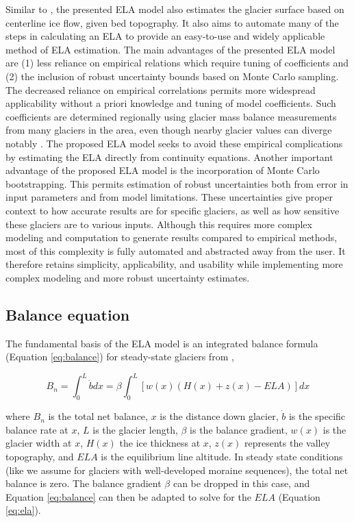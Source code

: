 \documentclass[review]{elsarticle}
\begin{document}
Similar to \cite{benn_exceltm_2010, pellitero_glare_2016}, the presented ELA model also estimates the glacier surface based on centerline ice flow, given bed topography.
It also aims to automate many of the steps in calculating an ELA to provide an easy-to-use and widely applicable method of ELA estimation.
The main advantages of the presented ELA model are (1) less reliance on empirical relations which require tuning of coefficients and (2) the inclusion of robust uncertainty bounds based on Monte Carlo sampling.
The decreased reliance on empirical correlations permits more widespread applicability without a priori knowledge and tuning of model coefficients.
Such coefficients are determined regionally using glacier mass balance measurements from many glaciers in the area, even though nearby glacier values can diverge notably \cite{benn_mass_2000}.
The proposed ELA model seeks to avoid these empirical complications by estimating the ELA directly from continuity equations.
Another important advantage of the proposed ELA model is the incorporation of Monte Carlo bootstrapping.
This permits estimation of robust uncertainties both from error in input parameters and from model limitations.
These uncertainties give proper context to how accurate results are for specific glaciers, as well as how sensitive these glaciers are to various inputs.
Although this requires more complex modeling and computation to generate results compared to empirical methods, most of this complexity is fully automated and abstracted away from the user.
It therefore retains simplicity, applicability, and usability while implementing more complex modeling and more robust uncertainty estimates.

\subsection{Balance equation}

The fundamental basis of the ELA model is an integrated balance formula (Equation \ref{eq:balance}) for steady-state glaciers from \cite{oerlemans_minimal_2008},

\begin{equation}
\label{eq:balance}
B_n = \int_0^L \dot{b}dx = \beta \int_0^L \left[ w(x) \left( H(x)+z(x)-ELA \right) \right]dx
\end{equation}

where $B_n$ is the total net balance, $x$ is the distance down glacier, $\dot{b}$ is the specific balance rate at $x$, $L$ is the glacier length, $\beta$ is the balance gradient, $w(x)$ is the glacier width at $x$, $H(x)$ the ice thickness at $x$, $z(x)$ represents the valley topography, and $ELA$ is the equilibrium line altitude.
In steady state conditions (like we assume for glaciers with well-developed moraine sequences), the total net balance is zero.
The balance gradient $\beta$ can be dropped in this case, and Equation \ref{eq:balance} can then be adapted to solve for the $ELA$ (Equation \ref{eq:ela}).
\end{document}
